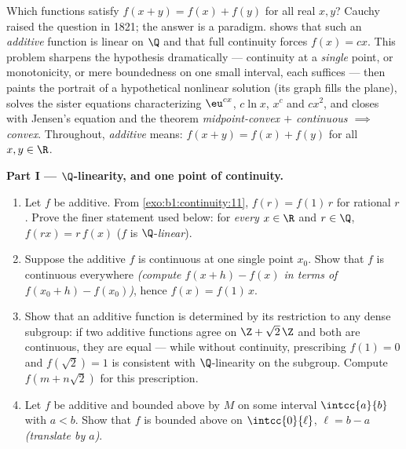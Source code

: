 \begin{problem}[{Weekend problem --- $f(x + y) = f(x) + f(y)$:
regularity forces linearity, and the portrait of the monsters}]
\label{pb:b1:continuity:1}
Which functions satisfy $f(x + y) = f(x) + f(y)$ for all real $x,
y$? Cauchy raised the question in 1821; the answer is a paradigm.
 shows that such an \emph{additive}
function is linear on $\Q$ and that full continuity forces $f(x)
= cx$. This problem sharpens the hypothesis dramatically ---
continuity at a \emph{single} point, or monotonicity, or mere
boundedness on one small interval, each suffices --- then paints
the portrait of a hypothetical nonlinear solution (its graph
fills the plane), solves the sister equations characterizing
$\eu^{cx}$, $c\ln x$, $x^c$ and $cx^2$, and closes with Jensen's
equation and the theorem \emph{midpoint-convex $+$ continuous
$\implies$ convex}. Throughout, \emph{additive}
means: $f(x + y) = f(x) + f(y)$ for all $x, y \in \R$.

\medskip
\noindent\textbf{Part I --- $\Q$-linearity, and one point of
continuity.}
\begin{enumerate}
  \item Let $f$ be additive. From \cref{exo:b1:continuity:11},
        $f(r) = f(1)\,r$ for rational $r$. Prove the finer
        statement used below: for \emph{every} $x \in \R$ and $r
        \in \Q$, $f(rx) = r\,f(x)$ ($f$ is
        $\Q$-\emph{linear}).
  \item Suppose the additive $f$ is continuous at one single
        point $x_0$. Show that $f$ is continuous everywhere
        \emph{(compute $f(x + h) - f(x)$ in terms of $f(x_0 + h)
        - f(x_0)$)}, hence $f(x) = f(1)\,x$.
  \item Show that an additive function is determined by its
        restriction to any dense subgroup: if two additive
        functions agree on $\Z + \sqrt2\,\Z$ and both are
        continuous, they are equal --- while without continuity,
        prescribing $f(1) = 0$ and $f(\sqrt 2) = 1$ is consistent
        with $\Q$-linearity on the subgroup. Compute $f(m +
        n\sqrt2)$ for this prescription.
  \item Let $f$ be additive and bounded above by $M$ on some
        interval $\intcc{a}{b}$ with $a < b$. Show that $f$ is
        bounded above on $\intcc{0}{\ell}$, $\ell = b - a$
        \emph{(translate by $a$)}.
\end{enumerate}


\end{problem}
